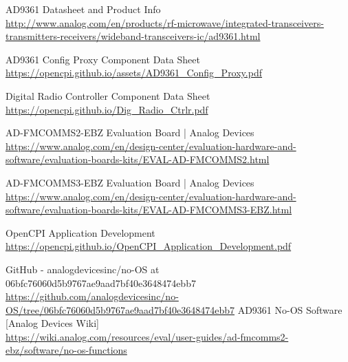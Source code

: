 \documentclass{article}
\begin{document}
\begin{thebibliography}{1}

   AD9361 Datasheet and Product Info \\
  \url{http://www.analog.com/en/products/rf-microwave/integrated-transceivers-transmitters-receivers/wideband-transceivers-ic/ad9361.html}

   AD9361 Config Proxy Component Data Sheet\\
  \url{https://opencpi.github.io/assets/AD9361_Config_Proxy.pdf}

   Digital Radio Controller Component Data Sheet \\
  \url{https://opencpi.github.io/Dig_Radio_Ctrlr.pdf}

   AD-FMCOMMS2-EBZ Evaluation Board | Analog Devices\\
  \url{https://www.analog.com/en/design-center/evaluation-hardware-and-software/evaluation-boards-kits/EVAL-AD-FMCOMMS2.html}

   AD-FMCOMMS3-EBZ Evaluation Board | Analog Devices\\
  \url{https://www.analog.com/en/design-center/evaluation-hardware-and-software/evaluation-boards-kits/EVAL-AD-FMCOMMS3-EBZ.html}

   OpenCPI Application Development \\
  \url{https://opencpi.github.io/OpenCPI_Application_Development.pdf}

   GitHub - analogdevicesinc/no-OS at 06bfc76060d5b9767ae9aad7bf40e3648474ebb7 \\
  \url{https://github.com/analogdevicesinc/no-OS/tree/06bfc76060d5b9767ae9aad7bf40e3648474ebb7}
   AD9361 No-OS Software [Analog Devices Wiki]\\
  \url{https://wiki.analog.com/resources/eval/user-guides/ad-fmcomms2-ebz/software/no-os-functions}

\end{thebibliography}
\end{document}
